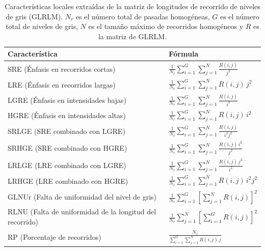 \begin{table}[!htbp]
\centering
\renewcommand{\arraystretch}{3.0}
\setlength{\tabcolsep}{12pt}
\caption{Características locales extraídas de la matriz de longitudes de recorrido de niveles de gris (GLRLM). $N_r$ es el número total de pasadas homogéneas, $G$ es el número total de niveles de gris, $N$ es el tamaño máximo de recorridos homogéneos y $R$ es la matriz de GLRLM.}
\label{tab:GLRLMR}
\begin{tabular*}{\textwidth}{@{\extracolsep{\fill}} l l}
\toprule
\textbf{Característica} & \textbf{Fórmula} \\
\midrule
SRE (Énfasis en recorridos cortas) & 
$\displaystyle \frac{1}{N_r} \sum_{i=1}^{G} \sum_{j=1}^{N} \frac{R(i,j)}{j^2}$ \\

LRE (Énfasis en recorridos largas) & 
$\displaystyle \frac{1}{N_r} \sum_{i=1}^{G} \sum_{j=1}^{N} R(i,j) \, j^2$ \\

LGRE (Énfasis en intensidades bajas) & 
$\displaystyle \frac{1}{N_r} \sum_{i=1}^{G} \sum_{j=1}^{N} \frac{R(i,j)}{i^2}$ \\

HGRE (Énfasis en intensidades altas) & 
$\displaystyle \frac{1}{N_r} \sum_{i=1}^{G} \sum_{j=1}^{N} R(i,j) \, i^2$ \\

SRLGE (SRE combinado con LGRE)& 
$\displaystyle \frac{1}{N_r} \sum_{i=1}^{G} \sum_{j=1}^{N} \frac{R(i,j)}{i^2 j^2}$ \\

SRHGE (SRE combinado con HGRE) & 
$\displaystyle \frac{1}{N_r} \sum_{i=1}^{G} \sum_{j=1}^{N} \frac{R(i,j) \, i^2}{j^2}$ \\

LRLGE (LRE combinado con LGRE)& 
$\displaystyle \frac{1}{N_r} \sum_{i=1}^{G} \sum_{j=1}^{N} \frac{R(i,j) \, j^2}{i^2}$ \\

LRHGE (LRE combinado con HGRE)& 
$\displaystyle \frac{1}{N_r} \sum_{i=1}^{G} \sum_{j=1}^{N} R(i,j) \, i^2 j^2$ \\

GLNUr (Falta de uniformidad del nivel de gris) & 
$\displaystyle \frac{1}{N_r} \sum_{i=1}^{G} \left[\sum_{j=1}^{N} R(i,j)\right]^2$ \\

RLNU (Falta de uniformidad de la longitud del recorrido)& 
$\displaystyle \frac{1}{N_r} \sum_{j=1}^{N} \left[\sum_{i=1}^{G} R(i,j)\right]^2$ \\

RP (Porcentaje de recorridos) & 
$\displaystyle \frac{N_r}{\sum_{i=1}^{G} \sum_{j=1}^{N} R(i,j) \, j}$ \\
\bottomrule
\end{tabular*}
\end{table}

